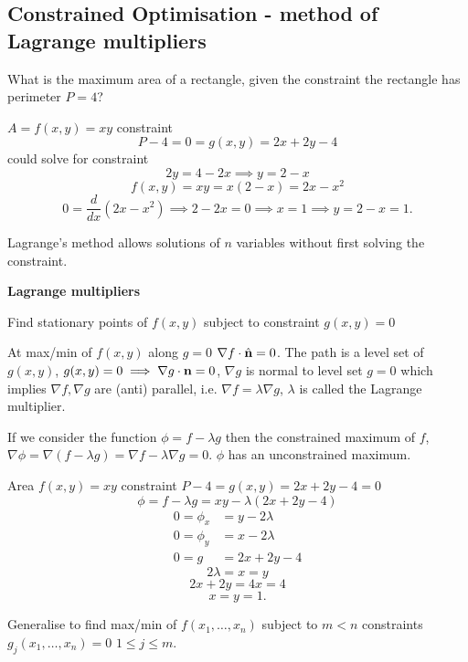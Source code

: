 \documentclass[10pt, a4paper]{article}
\begin{document}
\subsection{Constrained Optimisation - method of Lagrange multipliers}

\begin{example}
    What is the maximum area of a rectangle,
    given the constraint the rectangle has perimeter $P = 4$?

    $A = f(x, y) = xy$
    constraint
    \[
    P - 4 = 0 = g(x, y) = 2x + 2y - 4
    \]
    could solve for constraint
    \[
    2y = 4 - 2x \implies y = 2 - x
    \]
    \[
    f(x, y) = xy = x(2 - x) = 2x - x ^ 2
    \]
    \[
    0 = \frac{d}{dx}(2x - x ^ 2) \implies 2 - 2x = 0 \implies x = 1 \implies y = 2 - x = 1.
    \]
\end{example}

Lagrange's method allows solutions of $n$ variables without first solving the constraint.

\textbf{Lagrange multipliers}

Find stationary points of $f(x, y)$ subject to constraint $g(x, y) = 0$

At max/min of $f(x, y)$ along $g = 0$
$\nabla f \cdot \hat{\mathbf{n}} = 0$.
The path is a level set of $g(x, y)$,
$g(x, y) = 0 \implies \nabla g \cdot \mathbf{n} = 0$,
$\nabla g$ is normal to level set $g = 0$ which implies $\nabla f, \nabla g$ are
(anti)
parallel,
i.e. $\nabla f = \lambda\nabla g$,
$\lambda$ is called the Lagrange multiplier.

If we consider the function $\phi = f - \lambda g$ then the constrained maximum of $f$,
$\nabla\phi = \nabla(f - \lambda g) = \nabla f - \lambda\nabla g = 0$.
$\phi$ has an unconstrained maximum.

\begin{example}
    Area $f(x, y) = xy$ constraint $P - 4 = g(x, y) = 2x + 2y - 4 = 0$
    \[
    \phi = f - \lambda g = xy - \lambda(2x + 2y - 4)
    \]
    \begin{align*}
        0 = \phi_x &= y - 2\lambda \\
        0 = \phi_y &= x - 2\lambda \\
        0 = g &= 2x + 2y - 4
    \end{align*}
    \[
    2\lambda = x = y
    \]
    \[
    2x + 2y = 4x = 4
    \]
    \[
    x = y = 1.
    \]
\end{example}

Generalise to find max/min of $f(x_1, \dotsc, x_n)$ subject to $m < n$ constraints $g_j(x_1, \dotsc, x_n) = 0$ $1 \leq j \leq m$.
\end{document}
